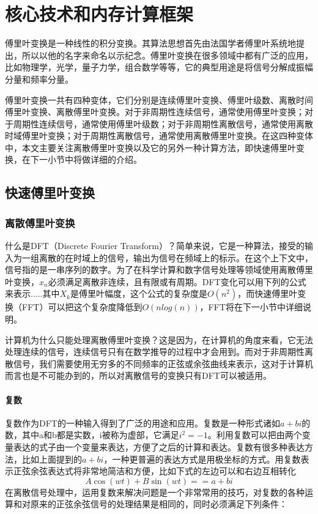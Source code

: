 
\chapter{核心技术和内存计算框架}
\label{chap:FFTandCos}

傅里叶变换是一种线性的积分变换。其算法思想首先由法国学者傅里叶系统地提出，所以以他的名字来命名以示纪念。傅里叶变换在很多领域中都有广泛的应用，比如物理学，光学，量子力学，组合数学等等，它的典型用途是将信号分解成振幅分量和频率分量。

傅里叶变换一共有四种变体，它们分别是连续傅里叶变换、傅里叶级数、离散时间傅里叶变换、离散傅里叶变换。对于非周期性连续信号，通常使用傅里叶变换；对于周期性连续信号，通常使用傅里叶级数；对于非周期性离散信号，通常使用离散时域傅里叶变换；对于周期性离散信号，通常使用离散傅里叶变换。在这四种变体中，本文主要关注离散傅里叶变换以及它的另外一种计算方法，即快速傅里叶变换，在下一小节中将做详细的介绍。

\section{快速傅里叶变换}
\label{sec:FT}

\subsection{离散傅里叶变换}
\label{sec:DFT}
什么是DFT（Discrete Fourier Transform）？简单来说，它是一种算法，接受的输入为一组离散的在时域上的信号，输出为信号在频域上的标示。在这个上下文中，信号指的是一串序列的数字。为了在科学计算和数字信号处理等领域使用离散傅里叶变换，$x_n$必须满足离散非连续，且有限或有周期。DFT变化可以用下列的公式来表示.....其中$X_k$是傅里叶幅度，这个公式的复杂度是$O(n^2)$，而快速傅里叶变换（FFT）可以把这个复杂度降低到$O(nlog(n))$，FFT将在下一小节中详细说明。

计算机为什么只能处理离散傅里叶变换？这是因为，在计算机的角度来看，它无法处理连续的信号，连续信号只有在数学推导的过程中才会用到。而对于非周期性离散信号，我们需要使用无穷多的不同频率的正弦或余弦曲线来表示，这对于计算机而言也是不可能办到的，所以对离散信号的变换只有DFT可以被适用。

\subsubsection{复数}
复数作为DFT的一种输入得到了广泛的用途和应用。复数是一种形式诸如$a+bi$的数，其中a和b都是实数，i被称为虚部，它满足$i^2=-1$。利用复数可以把由两个变量表达的式子由一个变量来表达，方便了之后的计算和表达。复数有很多种表达方法，比如上面提到的$a+bi$，一种更普遍的表达方式是用极坐标的方式。用复数表示正弦余弦表达式将非常地简洁和方便，比如下式的左边可以和右边互相转化$$A\cos (wt) + B\sin (wt) == a + bi$$在离散信号处理中，运用复数来解决问题是一个非常常用的技巧，对复数的各种运算和对原来的正弦余弦信号的处理结果是相同的，同时必须满足下列条件：

